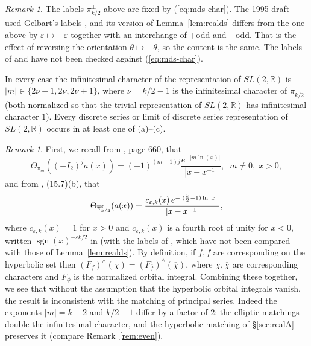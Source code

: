 \documentclass[12pt,letterpaper,openany]{book}
\theoremstyle{plain}
\theoremstyle{definition}
\theoremstyle{remark}
\newtheorem{remark}[theorem]{Remark}
\theoremstyle{remark}
\newtheorem{remyy}{Remark}
\DeclareMathOperator{\sgn}{sgn}
\begin{document}
\begin{remyy}\label{rem26:ds-labels}
The labels $\overline\pi{}^{\pm}_{k/2}$ above are fixed by
(\ref{eq:mds-char}). The 1995 draft used Gelbart's labels \cite{Ge2},
and its version of Lemma~\ref{lem:realds} differs from the one above by
$\varepsilon\mapsto-\varepsilon$ together with an interchange of $+$odd and
$-$odd. That is the effect of reversing the orientation
$\theta\mapsto-\theta$, so the content is the same. The labels of
\cite{Ge2} and \cite{Ad2} have not been checked against
(\ref{eq:mds-char}).
\end{remyy}

In every case the infinitesimal character of the representation of
$SL(2,{\mathbb R})$ is $|m|\in\{2\nu-1,2\nu,2\nu+1\}$, where
$\nu=k/2-1$ is the infinitesimal character of $\overline\pi{}^\pm_{k/2}$
(both normalized so that the trivial representation of $SL(2,{\mathbb R})$
has infinitesimal character $1$). Every discrete series or limit of
discrete series representation of $SL(2,{\mathbb R})$ occurs in at least
one of (a)--(c).

\begin{remark}
First, we recall from \cite{HC2}, page 660, that
\[
\Theta _{\pi _m}((-I_2)^ja(x))
=(-1)^{(m-1)j}\frac{e^{-|m\ln(x)|}}{|x-x^{-1}|}%
,\;\;m\neq 0,\;x>0,
\]
and from \cite{Ad2}, (15.7)(b), that
\[
\Theta _{\overline{\pi }_{k/2}^\varepsilon }(a(x))=\frac{%
c_{\varepsilon,k}(x)\,e^{-|(\frac k2-1)\ln|x||}}{|x-x^{-1}|},
\]
where $c_{\varepsilon,k}(x)=1$ for $x>0$ and $c_{\varepsilon,k}(x)$ is a fourth
root of unity for $x<0$, written $\sgn(x)^{-\varepsilon k/2}$ in \cite{Ad2}
(with the labels of \cite{Ad2}, which have not been compared with those
of Lemma~\ref{lem:realds}).
By definition, if $f,\overline{f}$ are corresponding on the hyperbolic set
then $(F_f)^{\wedge }(\chi )
=(F_{\overline{f}})^{\wedge }(\overline{\chi })$,
where $\chi ,\overline{\chi }$ are corresponding characters and
$F_\phi$ is the normalized orbital integral. Combining these
together, we see that without the assumption that
the hyperbolic orbital integrals vanish, the result is
inconsistent with the matching of principal series. Indeed the
exponents $|m|=k-2$ and $k/2-1$ differ by a factor of $2$: the elliptic
matchings double the infinitesimal character, and the hyperbolic matching
of \S\ref{sec:realA} preserves it (compare Remark~\ref{rem:even}).
\end{remark}

\end{document}
